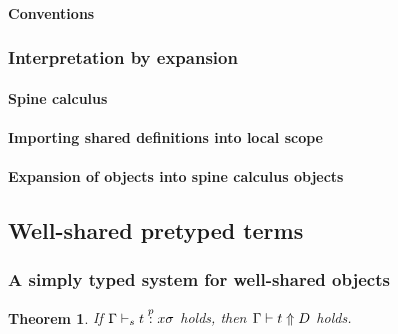 \documentclass[9pt,authoryear]{sigplanconf}
\newtheorem{theorem}{Theorem}
\begin{document}
\paragraph{Conventions} 




\subsubsection{Interpretation by expansion}

\paragraph{Spine calculus}


\paragraph{Importing shared definitions into local scope}


\paragraph{Expansion of {\system} objects into spine calculus objects}



\subsection{Well-shared pretyped terms}

\subsubsection{A simply typed system for well-shared objects}








\begin{theorem}
If $\Gamma \vdash_{s} t \stackrel{p}{:} x{\sigma}$ holds, then 
$\Gamma \vdash t \Uparrow D$ holds. 
\end{theorem}
\end{document}
